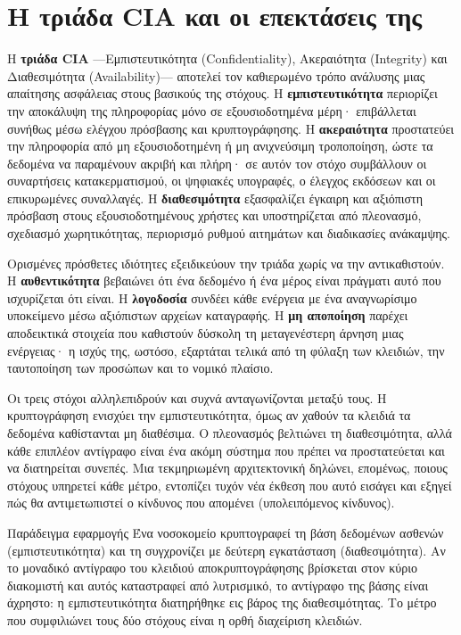 \section{Η τριάδα CIA και οι επεκτάσεις της}\label{sec:1.2}
Η \textbf{τριάδα CIA} —Εμπιστευτικότητα (Confidentiality), Ακεραιότητα (Integrity) και Διαθεσιμότητα (Availability)— αποτελεί τον καθιερωμένο τρόπο ανάλυσης μιας απαίτησης ασφάλειας στους βασικούς της στόχους. Η \textbf{εμπιστευτικότητα} περιορίζει την αποκάλυψη της πληροφορίας μόνο σε εξουσιοδοτημένα μέρη· επιβάλλεται συνήθως μέσω ελέγχου πρόσβασης και κρυπτογράφησης. Η \textbf{ακεραιότητα} προστατεύει την πληροφορία από μη εξουσιοδοτημένη ή μη ανιχνεύσιμη τροποποίηση, ώστε τα δεδομένα να παραμένουν ακριβή και πλήρη· σε αυτόν τον στόχο συμβάλλουν οι συναρτήσεις κατακερματισμού, οι ψηφιακές υπογραφές, ο έλεγχος εκδόσεων και οι επικυρωμένες συναλλαγές. Η \textbf{διαθεσιμότητα} εξασφαλίζει έγκαιρη και αξιόπιστη πρόσβαση στους εξουσιοδοτημένους χρήστες και υποστηρίζεται από πλεονασμό, σχεδιασμό χωρητικότητας, περιορισμό ρυθμού αιτημάτων και διαδικασίες ανάκαμψης.

Ορισμένες πρόσθετες ιδιότητες εξειδικεύουν την τριάδα χωρίς να την αντικαθιστούν. Η \textbf{αυθεντικότητα} βεβαιώνει ότι ένα δεδομένο ή ένα μέρος είναι πράγματι αυτό που ισχυρίζεται ότι είναι. Η \textbf{λογοδοσία} συνδέει κάθε ενέργεια με ένα αναγνωρίσιμο υποκείμενο μέσω αξιόπιστων αρχείων καταγραφής. Η \textbf{μη αποποίηση} παρέχει αποδεικτικά στοιχεία που καθιστούν δύσκολη τη μεταγενέστερη άρνηση μιας ενέργειας· η ισχύς της, ωστόσο, εξαρτάται τελικά από τη φύλαξη των κλειδιών, την ταυτοποίηση των προσώπων και το νομικό πλαίσιο.

Οι τρεις στόχοι αλληλεπιδρούν και συχνά ανταγωνίζονται μεταξύ τους. Η κρυπτογράφηση ενισχύει την εμπιστευτικότητα, όμως αν χαθούν τα κλειδιά τα δεδομένα καθίστανται μη διαθέσιμα. Ο πλεονασμός βελτιώνει τη διαθεσιμότητα, αλλά κάθε επιπλέον αντίγραφο είναι ένα ακόμη σύστημα που πρέπει να προστατεύεται και να διατηρείται συνεπές. Μια τεκμηριωμένη αρχιτεκτονική δηλώνει, επομένως, ποιους στόχους υπηρετεί κάθε μέτρο, εντοπίζει τυχόν νέα έκθεση που αυτό εισάγει και εξηγεί πώς θα αντιμετωπιστεί ο κίνδυνος που απομένει (υπολειπόμενος κίνδυνος).

\begin{examplebox}{Παράδειγμα εφαρμογής}
Ένα νοσοκομείο κρυπτογραφεί τη βάση δεδομένων ασθενών (εμπιστευτικότητα) και τη συγχρονίζει με δεύτερη εγκατάσταση (διαθεσιμότητα). Αν το μοναδικό αντίγραφο του κλειδιού αποκρυπτογράφησης βρίσκεται στον κύριο διακομιστή και αυτός καταστραφεί από λυτρισμικό, το αντίγραφο της βάσης είναι άχρηστο: η εμπιστευτικότητα διατηρήθηκε εις βάρος της διαθεσιμότητας. Το μέτρο που συμφιλιώνει τους δύο στόχους είναι η ορθή διαχείριση κλειδιών.
\end{examplebox}

